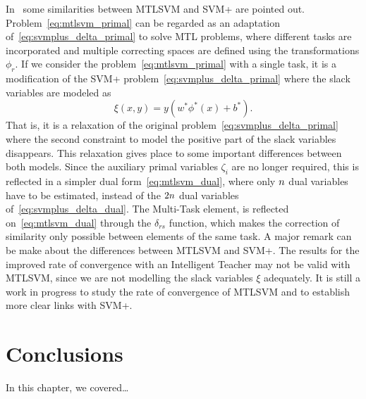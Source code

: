 In~\cite{LiangC08} some similarities between MTLSVM and SVM+ are pointed out. Problem~\eqref{eq:mtlsvm_primal} can be regarded as an adaptation of~\eqref{eq:svmplus_delta_primal} to solve MTL problems, where different tasks are incorporated and multiple correcting spaces are defined using the transformations $\phi_r$.
If we consider the problem~\eqref{eq:mtlsvm_primal} with a single task, it is a modification of the SVM+ problem~\eqref{eq:svmplus_delta_primal} where the slack variables are modeled as
$$ \xi(x, y) = y (w^* \phi^*(x) + b^*)  .$$
That is, it is a relaxation of the original problem~\eqref{eq:svmplus_delta_primal} where the second constraint to model the positive part of the slack variables disappears.
This relaxation gives place to some important differences between both models. Since the auxiliary primal variables $\zeta_i$ are no longer required, this is reflected in a simpler dual form~\eqref{eq:mtlsvm_dual}, where only $n$ dual variables have to be estimated, instead of the $2n$ dual variables of~\eqref{eq:svmplus_delta_dual}.
The Multi-Task element, is reflected on~\eqref{eq:mtlsvm_dual} through the $\delta_{rs}$ function, which makes the correction of similarity only possible between elements of the same task.
%
A major remark can be make about the differences between MTLSVM and SVM+. The results for the improved rate of convergence with an Intelligent Teacher may not be valid with MTLSVM, since we are not modelling the slack variables $\xi$ adequately. 
It is still a work in progress to study the rate of convergence of MTLSVM and to establish more clear links with SVM+.




\section{Conclusions}\label{sec-conclusions-2}

In this chapter, we covered\dots
